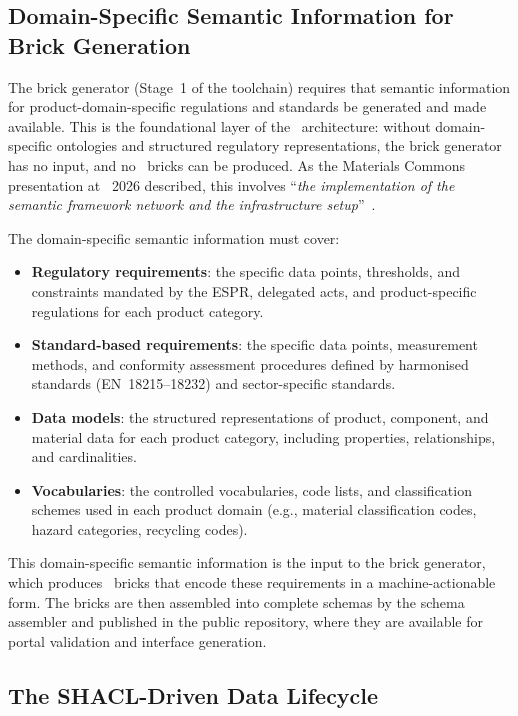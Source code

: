 \subsection{Domain-Specific Semantic Information for Brick Generation}

The brick generator (Stage~1 of the toolchain) requires that semantic
information for product-domain-specific regulations and standards be generated
and made available. This is the foundational layer of the \SHACL\ architecture:
without domain-specific ontologies and structured regulatory representations,
the brick generator has no input, and no \SHACL\ bricks can be produced. As the
Materials Commons presentation at \DPPforEU~2026 described, this involves
``\textit{the implementation of the semantic framework network and the
infrastructure setup}''~\cite{dpp4eu2026_day2}.

The domain-specific semantic information must cover:

\begin{itemize}
\item \textbf{Regulatory requirements}: the specific data points, thresholds,
and constraints mandated by the ESPR, delegated acts, and product-specific
regulations for each product category.
\item \textbf{Standard-based requirements}: the specific data points,
measurement methods, and conformity assessment procedures defined by harmonised
standards (EN~18215--18232) \cite{en18215, en18216, en18217, en18221, en18222}
and sector-specific standards.
\item \textbf{Data models}: the structured representations of product,
component, and material data for each product category, including properties,
relationships, and cardinalities.
\item \textbf{Vocabularies}: the controlled vocabularies, code lists, and
classification schemes used in each product domain (e.g., material
classification codes, hazard categories, recycling codes).
\end{itemize}

This domain-specific semantic information is the input to the brick generator,
which produces \SHACL\ bricks that encode these requirements in a
machine-actionable form. The bricks are then assembled into complete schemas by
the schema assembler and published in the public repository, where they are
available for portal validation and interface generation.

\subsection{The SHACL-Driven Data Lifecycle}

